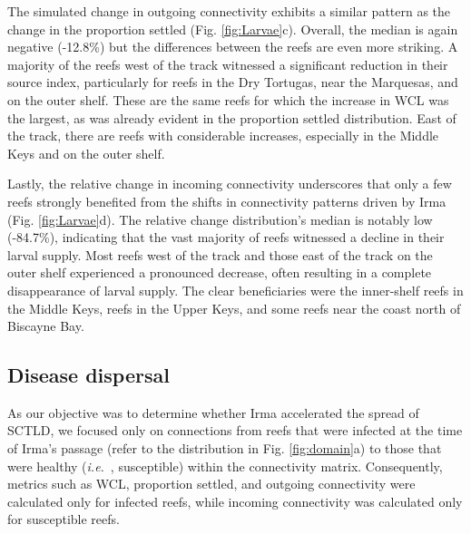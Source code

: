 \documentclass[fleqn,10pt]{wlscirep}
\newcommand{\ie}{{\it i.e.}\ }
\begin{document}

The simulated change in outgoing connectivity exhibits a similar pattern as the change in the proportion settled (Fig. \ref{fig:Larvae}c). Overall, the median is again negative (-12.8\%) but the differences between the reefs are even more striking. A majority of the reefs west of the track witnessed a significant reduction in their source index, particularly for reefs in the Dry Tortugas, near the Marquesas, and on the outer shelf. These are the same reefs for which the increase in WCL was the largest, as was already evident in the proportion settled distribution. East of the track, there are reefs with considerable increases, especially in the Middle Keys and on the outer shelf.

Lastly, the relative change in incoming connectivity underscores that only a few reefs strongly benefited from the shifts in connectivity patterns driven by Irma (Fig. \ref{fig:Larvae}d). The relative change distribution's median is notably low (-84.7\%), indicating that the vast majority of reefs witnessed a decline in their larval supply. Most reefs west of the track and those east of the track on the outer shelf experienced a pronounced decrease, often resulting in a complete disappearance of larval supply. The clear beneficiaries were the inner-shelf reefs in the Middle Keys, reefs in the Upper Keys, and some reefs near the coast north of Biscayne Bay.

\subsection{Disease dispersal}
As our objective was to determine whether Irma accelerated the spread of SCTLD, we focused only on connections from reefs that were infected at the time of Irma's passage (refer to the distribution in Fig. \ref{fig:domain}a) to those that were healthy (\ie, susceptible) within the connectivity matrix. Consequently, metrics such as WCL, proportion settled, and outgoing connectivity were calculated only for infected reefs, while incoming connectivity was calculated only for susceptible reefs.
\end{document}
